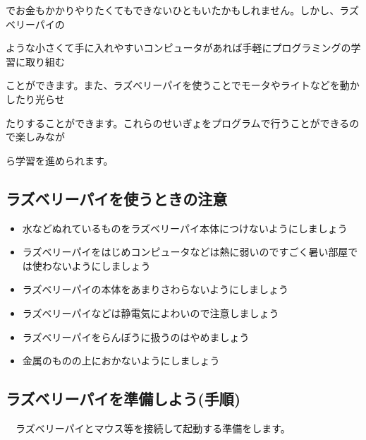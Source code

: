 \documentclass[a4paper,12pt]{jarticle}
\begin{document}
でお金もかかりやりたくてもできないひともいたかもしれません。しかし、ラズベリーパイの

ような小さくて手に入れやすいコンピュータがあれば手軽にプログラミングの学習に取り組む

ことができます。また、ラズベリーパイを使うことでモータやライトなどを動かしたり光らせ

たりすることができます。これらのせいぎょをプログラムで行うことができるので楽しみなが

ら学習を進められます。

\subsection{ラズベリーパイを使うときの注意}
\begin{itemize}
  \item
        水などぬれているものをラズベリーパイ本体につけないようにしましょう
\end{itemize}
\begin{itemize}
  \item
        ラズベリーパイをはじめコンピュータなどは熱に弱いのですごく暑い部屋では使わないようにしましょう
\end{itemize}
\begin{itemize}
  \item
        ラズベリーパイの本体をあまりさわらないようにしましょう
  \item
        ラズベリーパイなどは静電気によわいので注意しましょう
\end{itemize}
\begin{itemize}
  \item
        ラズベリーパイをらんぼうに扱うのはやめましょう
\end{itemize}
\begin{itemize}
  \item
        金属のものの上におかないようにしましょう
\end{itemize}

\clearpage

\subsection{ラズベリーパイを準備しよう(手順)}
\ \ ラズベリーパイとマウス等を接続して起動する準備をします。
\end{document}
